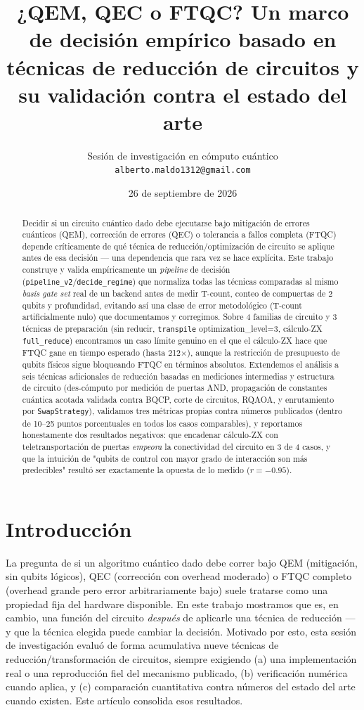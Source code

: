 \documentclass[9pt,twocolumn]{extarticle}
\title{\vspace{-1.2cm}\textbf{¿QEM, QEC o FTQC? Un marco de decisión empírico basado en\\
técnicas de reducción de circuitos y su validación contra el estado del arte}}
\author{\footnotesize Sesión de investigación en cómputo cuántico \\[-2pt]
\footnotesize \texttt{alberto.maldo1312@gmail.com}}
\date{\footnotesize 26 de septiembre de 2026}
\begin{document}
\maketitle

\begin{abstract}
\noindent
Decidir si un circuito cuántico dado debe ejecutarse bajo mitigación de
errores cuánticos (QEM), corrección de errores (QEC) o tolerancia a fallos
completa (FTQC) depende críticamente de qué técnica de reducción/optimización
de circuito se aplique antes de esa decisión --- una dependencia que rara vez
se hace explícita. Este trabajo construye y valida empíricamente un
\emph{pipeline} de decisión (\texttt{pipeline\_v2}/\texttt{decide\_regime})
que normaliza todas las técnicas comparadas al mismo \emph{basis gate set}
real de un backend antes de medir T-count, conteo de compuertas de 2 qubits y
profundidad, evitando así una clase de error metodológico (T-count
artificialmente nulo) que documentamos y corregimos. Sobre 4 familias de
circuito y 3 técnicas de preparación (sin reducir, \texttt{transpile}
optimization\_level=3, cálculo-ZX \texttt{full\_reduce}) encontramos un caso
límite genuino en el que el cálculo-ZX hace que FTQC gane en tiempo esperado
(hasta 212$\times$), aunque la restricción de presupuesto de qubits físicos
sigue bloqueando FTQC en términos absolutos. Extendemos el análisis a seis
técnicas adicionales de reducción basadas en mediciones intermedias y
estructura de circuito (des-cómputo por medición de puertas AND, propagación
de constantes cuántica acotada validada contra BQCP, corte de circuitos,
RQAOA, y enrutamiento por \texttt{SwapStrategy}), validamos tres métricas
propias contra números publicados (dentro de 10--25 puntos porcentuales en
todos los casos comparables), y reportamos honestamente dos resultados
negativos: que encadenar cálculo-ZX con teletransportación de puertas
\emph{empeora} la conectividad del circuito en 3 de 4 casos, y que la
intuición de "qubits de control con mayor grado de interacción son más
predecibles" resultó ser exactamente la opuesta de lo medido ($r=-0.95$).
\end{abstract}

\section{Introducción}
La pregunta de si un algoritmo cuántico dado debe correr bajo QEM (mitigación,
sin qubits lógicos), QEC (corrección con overhead moderado) o FTQC completo
(overhead grande pero error arbitrariamente bajo) suele tratarse como una
propiedad fija del hardware disponible. En este trabajo mostramos que es, en
cambio, una función del circuito \emph{después} de aplicarle una técnica de
reducción --- y que la técnica elegida puede cambiar la decisión. Motivado por
esto, esta sesión de investigación evaluó de forma acumulativa nueve técnicas
de reducción/transformación de circuitos, siempre exigiendo (a) una
implementación real o una reproducción fiel del mecanismo publicado, (b)
verificación numérica cuando aplica, y (c) comparación cuantitativa contra
números del estado del arte cuando existen. Este artículo consolida esos
resultados.
\end{document}
